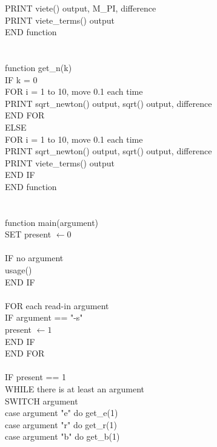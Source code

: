 \documentclass[12pt]{article}
\begin{document}
\indent \indent PRINT viete() output, M\_PI, difference \\
\indent \indent PRINT viete\_terms() output \\
END function \\
\\
\\
function get\_n(k) \\
\indent IF k = 0 \\
\indent \indent FOR i = 1 to 10, move 0.1 each time \\
\indent \indent \indent PRINT sqrt\_newton() output, sqrt() output, difference \\
\indent \indent END FOR \\
\indent ELSE \\
\indent \indent FOR i = 1 to 10, move 0.1 each time \\
\indent \indent \indent PRINT sqrt\_newton() output, sqrt() output, difference \\
\indent \indent \indent PRINT viete\_terms() output \\
\indent END IF \\
END function \\
\\
\\
function main(argument) \\
\indent SET present $\leftarrow 0$ \\
\\
\indent IF no argument \\
\indent \indent usage() \\
\indent END IF \\
\\
\indent FOR each read-in argument \\
\indent \indent IF argument == "-s" \\
\indent \indent \indent present $\leftarrow 1$ \\
\indent \indent END IF \\
\indent END FOR \\
\\
\indent IF present == 1 \\
\indent \indent WHILE there is at least an argument \\
\indent \indent \indent SWITCH argument \\
\indent \indent \indent \indent case argument "e" do get\_e(1) \\
\indent \indent \indent \indent case argument "r" do get\_r(1) \\
\indent \indent \indent \indent case argument "b" do get\_b(1) \\
\end{document}
